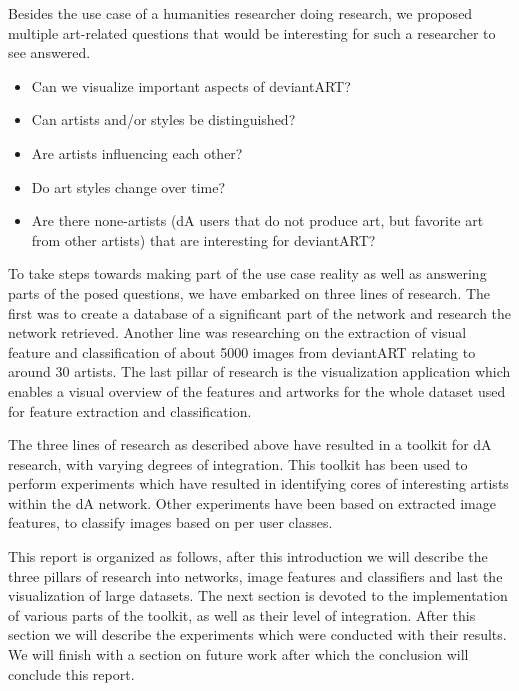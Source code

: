 Besides the use case of a humanities researcher doing research, we proposed multiple art-related questions that would be interesting for such a researcher to see answered.
\begin{itemize}
\item Can we visualize important aspects of deviantART?
\item Can artists and/or styles be distinguished?
\item Are artists influencing each other?
\item Do art styles change over time?
\item Are there none-artists (dA users that do not produce art, but favorite art from other artists) that are interesting for deviantART?
\end{itemize}

To take steps towards making part of the use case reality as well as answering parts of the posed questions, we have embarked on three lines of research. The first was to create a database of a significant part of the network and research the network retrieved. Another line was researching on the extraction of visual feature and classification of about 5000 images from deviantART relating to around 30 artists. The last pillar of research is the visualization application which enables a visual overview of the features and artworks for the whole dataset used for feature extraction and classification.

The three lines of research as described above have resulted in a toolkit for dA research, with varying degrees of integration. This toolkit has been used to perform experiments which have resulted in identifying cores of interesting artists within the dA network. Other experiments have been based on extracted image features, to classify images based on per user classes.

This report is organized as follows, after this introduction we will describe the three pillars of research into networks, image features and classifiers and last the visualization of large datasets. The next section is devoted to the implementation of various parts of the toolkit, as well as their level of integration. After this section we will describe the experiments which were conducted with their results. We will finish with a section on future work after which the conclusion will conclude this report. 